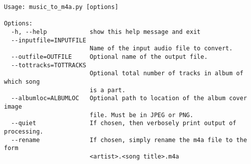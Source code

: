 \begin{verbatim}
Usage: music_to_m4a.py [options]

Options:
  -h, --help            show this help message and exit
  --inputfile=INPUTFILE
                        Name of the input audio file to convert.
  --outfile=OUTFILE     Optional name of the output file.
  --tottracks=TOTTRACKS
                        Optional total number of tracks in album of which song
                        is a part.
  --albumloc=ALBUMLOC   Optional path to location of the album cover image
                        file. Must be in JPEG or PNG.
  --quiet               If chosen, then verbosely print output of processing.
  --rename              If chosen, simply rename the m4a file to the form
                        <artist>.<song title>.m4a
\end{verbatim}